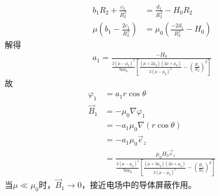 \documentclass{phyasgn}
\begin{document}
\begin{sol}[6]
\begin{align*}
        b_1R_2+\frac{c_1}{R_2^2}&=\frac{d_1}{R_2^2}-H_0R_2\\
        \mu\left(b_1-\frac{2c_1}{R_2^3}\right)&=\mu_0\left(\frac{-2d_1}{R_2^3}-H_0\right)
    \end{align*}
    解得
    \begin{align*}
        a_1=\frac{-H_0}{\frac{2(\mu-\mu_0)^2}{9\mu\mu_0}\left[\frac{(\mu+2\mu_0)(2\mu+\mu_0)}{2(\mu-\mu_0)^2}-\left(\frac{R_1}{R_2}\right)^2\right]}
    \end{align*}
    故
    \begin{align*}
        \varphi_1&=a_1r\cos\theta\\
        \vec{B}_1&=-\mu_0\nabla\varphi_1\\
        &=-a_1\mu_0\nabla\left(r\cos\theta\right)\\
        &=-a_1\mu_0\vec{e}_z\\
        &=\frac{\mu_0H_0\vec{e}_z}{\frac{2(\mu-\mu_0)^2}{9\mu\mu_0}\left[\frac{(\mu+2\mu_0)(2\mu+\mu_0)}{2(\mu-\mu_0)^2}-\left(\frac{R_1}{R_2}\right)^2\right]}
    \end{align*}
    当$\mu\ll \mu_0$时，$\vec{B}_1\to0$，接近电场中的导体屏蔽作用。
\end{sol}
\end{document}
